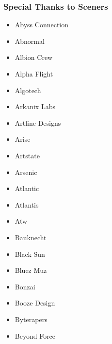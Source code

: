 \begin{frame}
\frametitle{Special Thanks to Sceners}

\begin{multicols}{3}
\begin{itemize}
\item Abyss Connection
\item Abnormal
\item Albion Crew
\item Alpha Flight
\item Algotech
\item Arkanix Labs
\item Artline Designs
\item Arise
\item Artstate
\item Arsenic
\item Atlantic
\item Atlantis
\item Atw
\item Bauknecht
\item Black Sun
\item Bluez Muz
\item Bonzai
\item Booze Design
\item Byterapers
\item Beyond Force
\end{itemize}
\end{multicols}

\end{frame}


